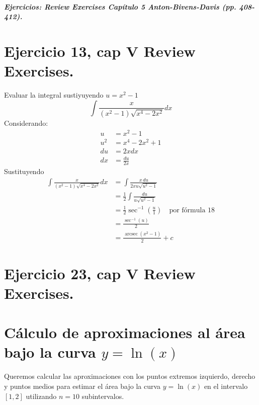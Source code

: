 \documentclass[11pt,letterpaper]{article}
\begin{document}

\subparagraph{Ejercicios: Review Exercises Capítulo 5 Anton-Bivens-Davis (pp. 408-412).}

\section{Ejercicio 13, cap V Review Exercises.}
Evaluar la integral sustiyuyendo $u=x^2-1$
\begin{equation*}
  \int \frac{x}{(x^2-1)\sqrt{x^4-2x^2}}dx
\end{equation*}
Considerando:
\begin{equation*}
  \begin{split}
    u &= x^2-1\\
    u^2 &= x^4-2x^2+1\\
    du &= 2xdx\\
    dx &= \frac{du}{2x}
  \end{split}
\end{equation*}
Sustituyendo
\begin{equation*}
  \begin{split}
    \int \frac{x}{ (x^2-1) \sqrt{x^4-2x^2}} dx &= \int \frac{x\, du}{2x u \sqrt{u^2-1}} \\
    &= \frac{1}{2}\int \frac{du}{u\sqrt{u^2-1}} \\
    &= \frac{1}{2} \operatorname{sec}^{-1}\left(\frac{u}{1}\right) \quad \text{por fórmula 18} \\
    &= \frac{\operatorname{sec}^{-1}(u)}{2} \\
    &= \frac{\operatorname{arcsec}(x^2-1)}{2} + c
  \end{split}
\end{equation*}

\section{Ejercicio 23, cap V Review Exercises.}
\section*{Cálculo de aproximaciones al área bajo la curva \(y = \ln(x)\)}

Queremos calcular las aproximaciones con los puntos extremos izquierdo, derecho y puntos medios para estimar el área bajo la curva \(y = \ln(x)\) en el intervalo \([1, 2]\) utilizando \(n = 10\) subintervalos.
\end{document}

